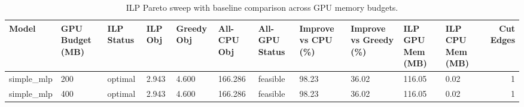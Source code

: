 \begin{table}[t]
\centering
\caption{ILP Pareto sweep with baseline comparison across GPU memory budgets.}
\label{tab:ilp-budget-sweep}
\begin{tabular}{lllllllllllr}
\toprule
Model & GPU Budget (MB) & ILP Status & ILP Obj & Greedy Obj & All-CPU Obj & All-GPU Status & Improve vs CPU (\%) & Improve vs Greedy (\%) & ILP GPU Mem (MB) & ILP CPU Mem (MB) & Cut Edges \\
\midrule
simple_mlp & 200 & optimal & 2.943 & 4.600 & 166.286 & feasible & 98.23 & 36.02 & 116.05 & 0.02 & 1 \\
simple_mlp & 400 & optimal & 2.943 & 4.600 & 166.286 & feasible & 98.23 & 36.02 & 116.05 & 0.02 & 1 \\
\bottomrule
\end{tabular}

\end{table}
